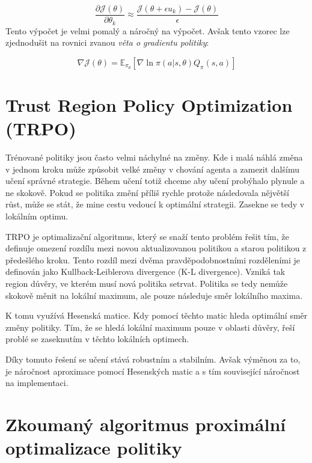 \begin{equation}
  \label{eq:gradient_politiky}
  \frac{\partial \mathcal{J}(\theta)}{\partial \theta_k} \approx \frac{\mathcal{J}(\theta + \epsilon u_k) - \mathcal{J}(\theta)}{\epsilon}
\end{equation}
Tento výpočet je velmi pomalý a náročný na výpočet.
Avšak tento vzorec lze zjednodušit na rovnici zvanou \emph{věta o gradientu politiky}:

\begin{equation}
    \label{eq:veta_o_gradientu_politiky}
  \nabla \mathcal{J}(\theta) = \mathbb{E}_{\pi_\theta} [\nabla \ln \pi(a \vert s, \theta) Q_\pi(s, a)]
\end{equation}

\section{Trust Region Policy Optimization (TRPO)}\label{sec:trust-region-policy-optimization}
Trénované politiky jsou často velmi náchylné na změny.
Kde i malá náhlá změna v jednom kroku může způsobit velké změny v chování agenta a zamezit dalšímu učení správné strategie.
Během učení totiž chceme aby učení probýhalo plynule a ne skokově.
Pokud se politika změní příliš rychle protože následovala nějvětší růst, může se stát, že mine cestu vedoucí k optimální strategii.
Zasekne se tedy v lokálním optimu.

TRPO je optimalizační algoritmus, který se snaží tento problém řešit tím, že definuje omezení rozdílu mezi novou aktualizovanou politikou a starou politikou z předešlého kroku.
Tento rozdíl mezi dvěma pravděpodobnostními rozděleními je definován jako Kullback-Leiblerova divergence (K-L divergence)\cite{KL_divergence}.
Vzniká tak region důvěry, ve kterém musí nová politika setrvat.
Politika se tedy nemůže skokově měnit na lokální maximum, ale pouze následuje směr lokálního maxima.

K tomu využívá Hesenská matice.
Kdy pomocí těchto matic hleda optimální směr změny politiky.
Tím, že se hledá lokální maximum pouze v oblasti důvěry, řeší problé se zaseknutím v těchto lokálních optimech.

Díky tomuto řešení se učení stává robustním a stabilním.
Avšak výměnou za to, je náročnost aproximace pomocí Hesenských matic a s tím související náročnost na implementaci.

\section{Zkoumaný algoritmus proximální optimalizace politiky}
\label{sec:proximalni-optimalizace-politiky}

